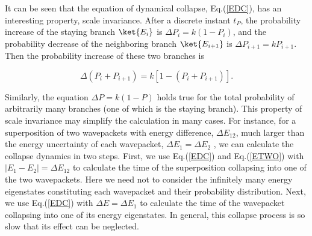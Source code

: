 It can be seen that the equation of dynamical collapse, Eq.(\ref{EDC}), has an interesting property, scale invariance. After a  discrete instant $t_P$, the probability increase of the staying branch $\ket{E_i}$ is $\Delta P_i = k (1- P_i)$, and the probability decrease of the neighboring branch $\ket{E_{i+1}}$ is $\Delta P_{i+1} = k P_{i+1}$. Then the probability increase of these two branches is

\begin{equation}
\Delta (P_i+P_{i+1}) = k [1-(P_i+P_{i+1})].
\label{}
\end{equation}

\noindent Similarly, the equation $\Delta P = k (1- P)$ holds true for the total probability of arbitrarily many branches (one of which is the staying branch). This property of scale invariance may simplify the calculation in many cases. For instance, for a superposition of two wavepackets with energy difference, $\Delta E_{12}$, much larger than the energy uncertainty of each wavepacket, $\Delta E_1=\Delta E_2$ , we can calculate the collapse dynamics in two steps. First, we use Eq.(\ref{EDC}) and Eq.(\ref{ETWO}) with $|E_1-E_2|=\Delta E_{12}$ to calculate the time of the superposition collapsing into one of the two wavepackets. Here we need not to consider the infinitely many energy eigenstates constituting each wavepacket and their probability distribution. Next, we use Eq.(\ref{EDC}) with $\Delta E=\Delta E_1$ to calculate the time of the wavepacket collapsing into one of its energy eigenstates. In general, this collapse process is so slow that its effect can be neglected. 


